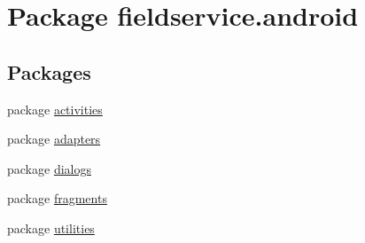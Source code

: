 \hypertarget{namespacefieldservice_1_1android}{\section{Package fieldservice.\+android}
\label{namespacefieldservice_1_1android}
}
\subsection*{Packages}
\begin{DoxyCompactItemize}
\item 
package \hyperlink{namespacefieldservice_1_1android_1_1activities}{activities}
\item 
package \hyperlink{namespacefieldservice_1_1android_1_1adapters}{adapters}
\item 
package \hyperlink{namespacefieldservice_1_1android_1_1dialogs}{dialogs}
\item 
package \hyperlink{namespacefieldservice_1_1android_1_1fragments}{fragments}
\item 
package \hyperlink{namespacefieldservice_1_1android_1_1utilities}{utilities}
\end{DoxyCompactItemize}
